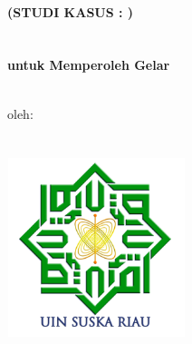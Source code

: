 \begin{titlepage}
    \begin{center}
        \fontsize{14pt}{16.8pt}\selectfont\MakeUppercase{\bo{\judul}}\\
        \bfseries(STUDI KASUS : \namaInstansi)\\
        \vspace{1.5cm}
        \fontsize{16pt}{19.2pt}\selectfont\MakeUppercase{\bo{\tipeta}}\\
        \vspace{1.5cm}
        \fontsize{11pt}{13.2pt}\selectfont {}\\
        untuk Memperoleh Gelar \gelar \space\\  \programStudi\\
        \vspace{1.5cm}

        \fontsize{13.5pt}{16.2pt}\selectfont oleh:\\
        \MakeUppercase{\bo{\underline{\penulis}}}\\
        \MakeUppercase{\bo{\nim}}\\


        \vfill
        \includegraphics[width=5.2cm, height=5.2cm]{kontrol/gambar/logouin.png}
        \vfill

        \fontsize{13.5pt}{16.2pt}\selectfont\MakeUppercase{\bo{\fakultas}}\\
        \MakeUppercase{\bo{\universitas}}\\
        \MakeUppercase{\bo{\kota}}\\
        \bo{\tahun}\\
    \end{center}
\end{titlepage}